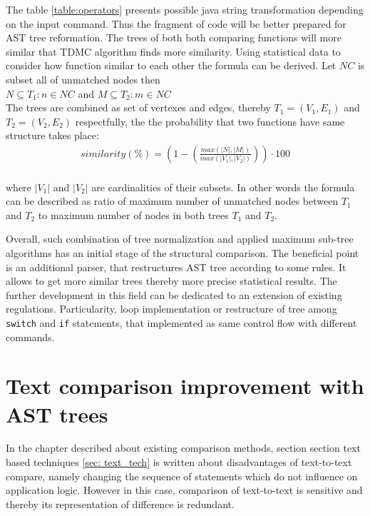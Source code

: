 \documentclass{report}
\begin{document}
The table \ref{table:operators} presents possible java string transformation depending on the input command. Thus the fragment of code will be better prepared for AST tree reformation. The trees of both both comparing functions will more similar that TDMC algorithm finds more similarity. Using statistical data to consider how function similar to each other the formula can be derived. Let $NC$ is subset all of unmatched nodes then\\
$ N \subseteq T_{1}: n \in NC $ and $ M \subseteq T_{2}: m \in NC $ \\
The trees are combined as set of vertexes and edges, thereby $T_{1} = (V_{1}, E_{1})$ and $T_{2} = (V_{2}, E_{2})$ respectfully, the the probability that two functions have same structure takes place: \\
\begin{gather*}
similarity(\%) =  \left ( 1 - \left (\frac{max(|N|, |M|)}{max(|V_{1}|, |V_{2}|)} \right ) \right )\cdot 100 
\end{gather*} \\
where $|V_{1}|$ and $|V_{2}|$ are cardinalities of their subsets. In other words the formula can be described as ratio of maximum number of unmatched nodes between $T_{1}$ and $T_{2}$ to maximum number of nodes in both trees $T_{1}$ and $T_{2}$. 

Overall, such combination of tree normalization and applied maximum sub-tree algorithms has an initial stage of the structural comparison. The beneficial point is an additional parser, that restructures AST tree according to some rules. It allows to get more similar trees thereby more precise statistical results. The further development in this field can be dedicated to an extension of existing regulations. Particularity, loop implementation or restructure of tree among \texttt{switch} and \texttt{if} statements, that implemented as same control flow with different commands. 


\chapter{Text comparison improvement with AST trees}
\label{cha:text-improvement}

In the chapter described about existing comparison methods, section section text based techniques  \ref{sec: text_tech} is written about disadvantages of text-to-text compare, namely changing the sequence of statements which do not influence on application logic. However in this case, comparison of text-to-text is sensitive  and thereby its representation of difference is redundant.
\end{document}
